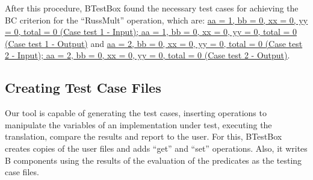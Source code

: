 \documentclass[runningheads]{llncs}
\begin{document}
After this procedure, BTestBox found the necessary test cases for achieving the BC criterion for the ``RussMult'' operation, which are: \ul{aa = 1, bb = 0, xx = 0, yy = 0, total = 0 (Case test 1 - Input);  aa = 1, bb = 0, xx = 0, yy = 0, total = 0 (Case test 1 - Output)} and \ul{aa = 2, bb = 0, xx = 0, yy = 0, total = 0 (Case test 2 - Input);  aa = 2, bb = 0, xx = 0, yy = 0, total = 0 (Case test 2 - Output)}. 

\subsection{Creating Test Case Files}

Our tool is capable of generating the test cases, inserting operations to manipulate the variables of an implementation under test, executing the translation, compare the results and report to the user. For this, BTestBox creates copies of the user files and adds ``get'' and ``set'' operations. Also, it writes B components using the results of the evaluation of the predicates as the testing case files.
\end{document}
